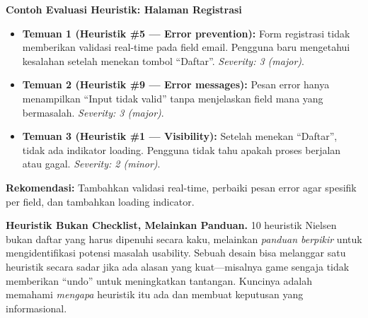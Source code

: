 \begin{contoh}
\textbf{Contoh Evaluasi Heuristik: Halaman Registrasi}

\begin{itemize}
  \item \textbf{Temuan 1 (Heuristik \#5 --- Error prevention):} Form registrasi tidak memberikan validasi real-time pada field email. Pengguna baru mengetahui kesalahan setelah menekan tombol ``Daftar''. \textit{Severity: 3 (major)}.
  \item \textbf{Temuan 2 (Heuristik \#9 --- Error messages):} Pesan error hanya menampilkan ``Input tidak valid'' tanpa menjelaskan field mana yang bermasalah. \textit{Severity: 3 (major)}.
  \item \textbf{Temuan 3 (Heuristik \#1 --- Visibility):} Setelah menekan ``Daftar'', tidak ada indikator loading. Pengguna tidak tahu apakah proses berjalan atau gagal. \textit{Severity: 2 (minor)}.
\end{itemize}

\textbf{Rekomendasi:} Tambahkan validasi real-time, perbaiki pesan error agar spesifik per field, dan tambahkan loading indicator.
\end{contoh}

\begin{konsep}
\textbf{Heuristik Bukan Checklist, Melainkan Panduan.} 10 heuristik Nielsen bukan daftar yang harus dipenuhi secara kaku, melainkan \textit{panduan berpikir} untuk mengidentifikasi potensi masalah usability. Sebuah desain bisa melanggar satu heuristik secara sadar jika ada alasan yang kuat---misalnya game sengaja tidak memberikan ``undo'' untuk meningkatkan tantangan. Kuncinya adalah memahami \textit{mengapa} heuristik itu ada dan membuat keputusan yang informasional.
\end{konsep}
